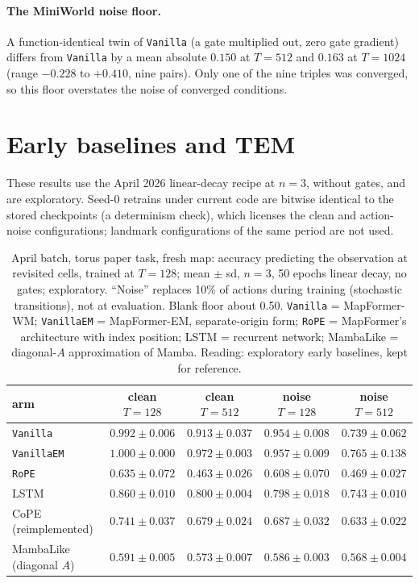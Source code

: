 \documentclass[10pt]{article}
\newcommand{\arm}[1]{\texttt{#1}}
\begin{document}
\paragraph{The MiniWorld noise floor.} A function-identical twin of \arm{Vanilla} (a gate multiplied out,
zero gate gradient) differs from \arm{Vanilla} by a mean absolute $0.150$ at $T=512$ and $0.163$ at $T=1024$
(range $-0.228$ to $+0.410$, nine pairs). Only one of the nine triples was converged, so this floor
overstates the noise of converged conditions. %

\section{Early baselines and TEM}
\label{app:baselines}

These results use the April 2026 linear-decay recipe at $n=3$, without gates, and are exploratory. Seed-0
retrains under current code are bitwise identical to the stored checkpoints (a determinism check), which licenses the clean and
action-noise configurations; landmark configurations of the same period are not used.

\begin{table}[h]
\centering
\small
\captionsetup{font=footnotesize,skip=4pt}
\caption{April batch, torus paper task, fresh map: accuracy predicting the observation at revisited cells, trained at $T=128$; mean $\pm$ sd, $n=3$, 50 epochs linear decay, no gates; exploratory. ``Noise'' replaces 10\% of actions during training (stochastic transitions), not at evaluation. Blank floor about 0.50. \arm{Vanilla} = MapFormer-WM; \arm{VanillaEM} = MapFormer-EM, separate-origin form; \arm{RoPE} = MapFormer's architecture with index position; LSTM = recurrent network; MambaLike = diagonal-$A$ approximation of Mamba. Reading: exploratory early baselines, kept for reference.}
\label{tab:april}
\begin{tabular}{@{}lcccc@{}}
\toprule
arm & clean $T=128$ & clean $T=512$ & noise $T=128$ & noise $T=512$ \\
\midrule
\arm{Vanilla}   & $0.992\pm0.006$ & $0.913\pm0.037$ & $0.954\pm0.008$ & $0.739\pm0.062$ \\
\arm{VanillaEM} & $1.000\pm0.000$ & $0.972\pm0.003$ & $0.957\pm0.009$ & $0.765\pm0.138$ \\
\arm{RoPE}      & $0.635\pm0.072$ & $0.463\pm0.026$ & $0.608\pm0.070$ & $0.469\pm0.027$ \\
LSTM            & $0.860\pm0.010$ & $0.800\pm0.004$ & $0.798\pm0.018$ & $0.743\pm0.010$ \\
CoPE (reimplemented) & $0.741\pm0.037$ & $0.679\pm0.024$ & $0.687\pm0.032$ & $0.633\pm0.022$ \\
MambaLike (diagonal $A$) & $0.591\pm0.005$ & $0.573\pm0.007$ & $0.586\pm0.003$ & $0.568\pm0.004$ \\
\bottomrule
\end{tabular}
\end{table}
\end{document}
